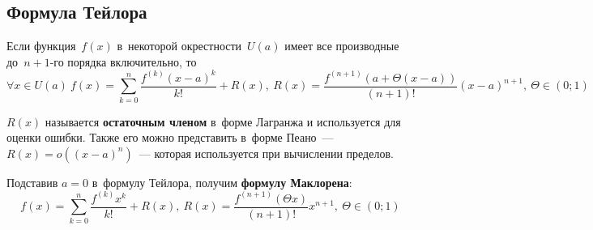 \subsection{Формула Тейлора}
\begin{theorem}
\label{eq:Taylor_series}
Если функция~$f(x)$ в~некоторой окрестности~$U(a)$ имеет все производные до~$n + 1$-го порядка включительно, то
\begin{equation*}
\forall x \in U(a) \
f(x) = \sum_{k=0}^n \frac{f^{(k)} (x - a)^k}{k!} + R(x), \
R(x) = \frac{f^{(n + 1)}(a + \Theta(x - a))}{(n + 1)!}(x - a)^{n + 1}, \
\Theta \in (0; 1)
\end{equation*}
\end{theorem}

$R(x)$ называется \textbf{остаточным членом} в~форме Лагранжа и используется для оценки ошибки. Также его можно представить в~форме Пеано~--- $R(x) = o((x - a)^n)$~--- которая используется при вычислении пределов.

Подставив $a = 0$ в~формулу Тейлора, получим \textbf{формулу Маклорена}:
\begin{equation}
\label{eq:Maclaurin_series}
f(x) = \sum_{k=0}^n \frac{f^{(k)} x^k}{k!} + R(x), \
R(x) = \frac{f^{(n + 1)}(\Theta x)}{(n + 1)!} x^{n + 1}, \
\Theta \in (0; 1)
\end{equation}

